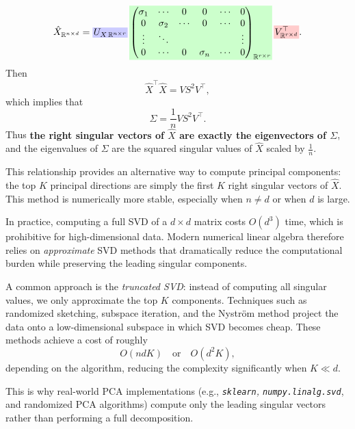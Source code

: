 \documentclass[../main]{subfiles}
\begin{document}
\begin{equation}
  \hat{X}_{\mathbb{R}^{n\times d}}
  =
  \mblock{blue}{ U_{X\,\mathbb{R}^{n\times r}}}\,
  \mblock{green}{\begin{pmatrix}
    \sigma_1&\cdots &0&0&\cdots&0\\
    0&\sigma_2&\cdots&0&\cdots&0\\
    \vdots&\ddots &&&&\vdots\\
    0&\cdots&0&\sigma_n&\cdots&0
    \end{pmatrix} _{ \mathbb{R}^{r\times r}}}\,
  \mblock{red}{V^{\top}_ {\mathbb{R}^{r\times d}} }.
\end{equation}
        Then
        \begin{equation}
            \hat{X}^{\top}\hat{X}
            = V S^{2} V^{\top},
        \end{equation}
        which implies that
        \begin{equation}
            \Sigma = \frac{1}{n} V S^{2} V^{\top}.
        \end{equation}
        Thus \textbf{the right singular vectors of $\hat{X}$ are exactly the eigenvectors of $\Sigma$},  
        and the eigenvalues of $\Sigma$ are the squared singular values of $\hat{X}$ scaled by $\tfrac{1}{n}$.

        
        \begin{remark}
        This relationship provides an alternative way to compute principal components:  
        the top $K$ principal directions are simply the first $K$ right singular vectors of $\hat{X}$.  
        This method is numerically more stable, especially when $n \neq d$ or when $d$ is large.
        \end{remark}
        \begin{note}
            In practice, computing a full SVD of a \(d\times d\) matrix costs \(O(d^3)\) time,  
            which is prohibitive for high-dimensional data.  
            Modern numerical linear algebra therefore relies on \emph{approximate} SVD methods  
            that dramatically reduce the computational burden while preserving the leading singular components.
        
            A common approach is the \emph{truncated SVD}:  
            instead of computing all singular values, we only approximate the top \(K\) components.  
            Techniques such as randomized sketching, subspace iteration, and the Nyström method  
            project the data onto a low-dimensional subspace in which SVD becomes cheap.  
            These methods achieve a cost of roughly
            \begin{equation*}
                O(ndK) \quad\text{or}\quad O(d^2K),
            \end{equation*}
            depending on the algorithm, reducing the complexity significantly when \(K \ll d\).
        
            This is why real-world PCA implementations (e.g., \emph{\texttt{sklearn}, \texttt{numpy.linalg.svd}},  
            and randomized PCA algorithms) compute only the leading singular vectors rather than performing a full decomposition.
        \end{note}
\end{document}
